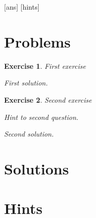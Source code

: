 \documentclass[12pt,a4paper]{article}
\newtheorem{ex}{Exercise}
\begin{document}
[ans]
[hints]
\section{Problems}
\begin{ex}
First exercise
\begin{sol}
First solution.
\end{sol}
\end{ex}
\begin{ex}
Second exercise
\begin{hint}
Hint to second question.
\end{hint}
\begin{sol}
Second solution.
\end{sol}
\end{ex}
\section{Solutions}


\section{Hints}

\end{document}
